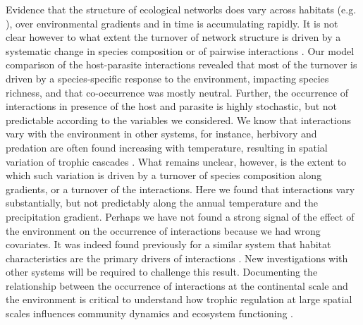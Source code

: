 \documentclass[12pt]{article}
\begin{document}
Evidence that the structure of ecological networks does vary across habitats
(e.g. \citealt{Tylianakis2007, Plein2012}), over environmental gradients
\citealt{Lurgi2010} and in time \citep{Trolsgaard2015} is accumulating
rapidly. It is not clear however to what extent the turnover of network
structure is driven by a systematic change in species composition or of
pairwise interactions \citep{Poisot2012, Poisot2015a}. Our model comparison of
the host-parasite interactions revealed that most of the turnover is driven by
a species-specific response to the environment, impacting species richness,
and that co-occurrence was mostly neutral. Further, the occurrence of
interactions in presence of the host and parasite is highly stochastic, but
not predictable according to the variables we considered. We know that
interactions vary with the environment in other systems, for instance,
herbivory \citep{Shurin2012} and predation \citep{McKinnon2010, Legagneux2014}
are often found increasing with temperature, resulting in spatial variation of
trophic cascades \citep{(Gray2016}. What remains unclear, however, is the
extent to which such variation is driven by a turnover of species composition
along gradients, or a turnover of the interactions. Here we found that
interactions vary substantially, but not predictably along the annual
temperature and the precipitation gradient. Perhaps we have not found a strong
signal of the effect of the environment on the occurrence of interactions
because we had wrong covariates. It was indeed found previously for a similar
system that habitat characteristics are the primary drivers of interactions
\citep{Nyman2015}. New investigations with other systems will be required to
challenge this result. Documenting the relationship between the occurrence of
interactions at the continental scale and the environment is critical to
understand how trophic regulation at large spatial scales influences
community dynamics and ecosystem functioning \citep{Harfoot2013}.
\end{document}
